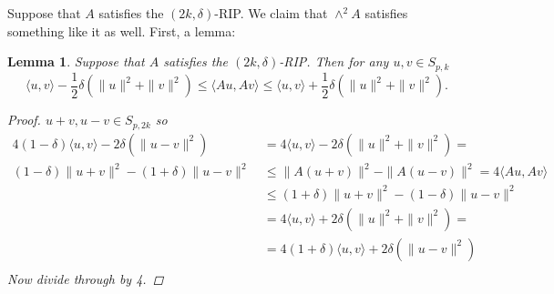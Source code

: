 \documentclass[11pt]{amsart}
\newtheorem{lemma}{Lemma}
\begin{document}
Suppose that $A$ satisfies the $(2k, \delta)$-RIP.  We claim that $\wedge^2 A$ satisfies something like it as well.  
First, a lemma:
\begin{lemma}
Suppose that $A$ satisfies the $(2k, \delta)$-RIP.  Then for any $u,v\in S_{p,k}$  
\begin{equation}
\langle u, v \rangle-\frac{1}{2} \delta (\|u\|^2 + \|v\|^2) \leq \langle Au,Av \rangle\leq \langle u, v \rangle+\frac{1}{2} \delta (\|u\|^2 + \|v\|^2).
\end{equation}
\begin{proof}
$u+v, u-v \in S_{p,2k}$ so 
\begin{align*}
4(1-\delta) \langle u, v \rangle-2 \delta (\|u-v\|^2)&=4 \langle u, v \rangle-2 \delta (\|u\|^2 + \|v\|^2) = \\
(1-\delta) \|u+v\|^2- (1+\delta) \|u-v\|^2 \ &\leq \|A(u+v)\|^2- \|A(u-v)\|^2 =4 \langle Au, Av\rangle  \\
&\leq  (1+\delta) \|u+v\|^2- (1-\delta) \|u-v\|^2 \\
&=4 \langle u, v \rangle+2 \delta (\|u\|^2 + \|v\|^2)=\\
&=4(1+\delta) \langle u, v \rangle+2 \delta (\|u-v\|^2)\\ 
\end{align*}
Now divide through by 4.
\end{proof}
\end{lemma}


\end{document}
